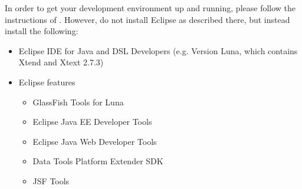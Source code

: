 
In order to get your development environment up and running, please follow the instructions of  . However, do not install Eclipse as described there, but instead install the following:

\begin{itemize}
\item Eclipse IDE for Java and DSL Developers (e.g. Version Luna, which contains Xtend and Xtext 2.7.3)
\item Eclipse features
\begin{itemize}
	\item GlassFish Tools for Luna
	\item Eclipse Java EE Developer Tools
	\item Eclipse Java Web Developer Tools
	\item Data Tools Platform Extender SDK
	\item JSF Tools
\end{itemize}

\end{itemize}




